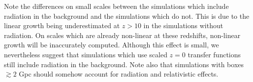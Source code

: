 \documentclass[useAMS, usenatbib]{mnras}
\begin{document}
Note the differences on small scales between the simulations which
include radiation in the background and the simulations which do not.
This is due to the linear growth being underestimated
at $z > 10$ in the simulations without radiation. On scales which are
already non-linear at these redshifts, non-linear growth will be inaccurately
computed. Although this effect is small, we nevertheless suggest that simulations
which use scaled $z=0$ transfer functions still include radiation in the background.
Note also that simulations with boxes $\gtrsim 2$ Gpc should somehow account
for radiation and relativistic effects.

\label{lastpage}


\end{document}
